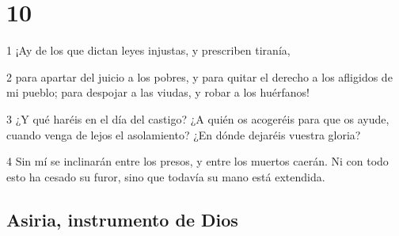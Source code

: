 \chapter{10}

\par 1 ¡Ay de los que dictan leyes injustas, y prescriben tiranía,
\par 2 para apartar del juicio a los pobres, y para quitar el derecho a los afligidos de mi pueblo; para despojar a las viudas, y robar a los huérfanos!
\par 3 ¿Y qué haréis en el día del castigo? ¿A quién os acogeréis para que os ayude, cuando venga de lejos el asolamiento? ¿En dónde dejaréis vuestra gloria?
\par 4 Sin mí se inclinarán entre los presos, y entre los muertos caerán. Ni con todo esto ha cesado su furor, sino que todavía su mano está extendida.

\section*{Asiria, instrumento de Dios}


